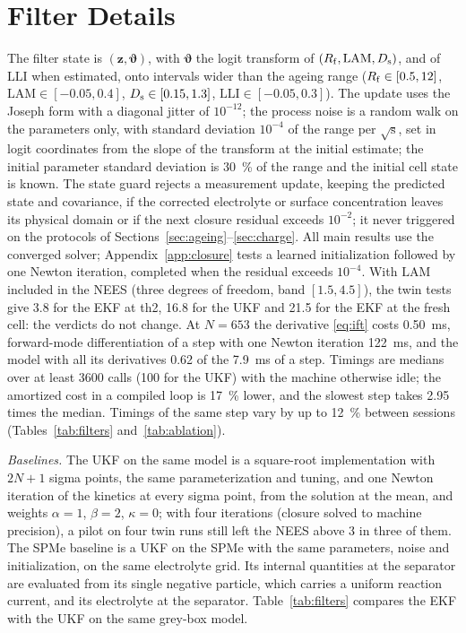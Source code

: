 \documentclass[journal]{IEEEtran}
\newcommand{\vz}{\bm{z}}\newcommand{\vj}{\bm{j}}\newcommand{\vy}{\bm{y}}\newcommand{\vw}{\bm{w}}
\newcommand{\LAM}{\mathrm{LAM}}\newcommand{\LLI}{\mathrm{LLI}}\newcommand{\phipl}{\phi_{\mathrm{pl}}}
\begin{document}
\section{Filter Details}\label{app:filter}
The filter state is $(\vz,\bm\vartheta)$, with $\bm\vartheta$ the logit transform of $(\Rf,\LAM,\Ds)$, and of $\LLI$ when estimated, onto intervals wider than the ageing range ($R_{\mathrm{f}}\in[0.5,12]$, $\LAM\in[-0.05,0.4]$, $D_{\mathrm{s}}\in[0.15,1.3]$, $\LLI\in[-0.05,0.3]$). The update uses the Joseph form with a diagonal jitter of $10^{-12}$; the process noise is a random walk on the parameters only, with standard deviation $10^{-4}$ of the range per $\sqrt{\mathrm{s}}$, set in logit coordinates from the slope of the transform at the initial estimate; the initial parameter standard deviation is \SI{30}{\percent} of the range and the initial cell state is known. The state guard rejects a measurement update, keeping the predicted state and covariance, if the corrected electrolyte or surface concentration leaves its physical domain or if the next closure residual exceeds $10^{-2}$; it never triggered on the protocols of Sections~\ref{sec:ageing}--\ref{sec:charge}. All main results use the converged solver; Appendix~\ref{app:closure} tests a learned initialization followed by one Newton iteration, completed when the residual exceeds $10^{-4}$. With $\LAM$ included in the NEES (three degrees of freedom, band $[1.5,4.5]$), the twin tests give 3.8 for the EKF at th2, 16.8 for the UKF and 21.5 for the EKF at the fresh cell: the verdicts do not change. At $N=653$ the derivative \eqref{eq:ift} costs \SI{0.50}{\milli\second}, forward-mode differentiation of a step with one Newton iteration \SI{122}{\milli\second}, and the model with all its derivatives 0.62 of the \SI{7.9}{\milli\second} of a step. Timings are medians over at least 3600 calls (100 for the UKF) with the machine otherwise idle; the amortized cost in a compiled loop is \SI{17}{\percent} lower, and the slowest step takes 2.95 times the median. Timings of the same step vary by up to \SI{12}{\percent} between sessions (Tables~\ref{tab:filters} and~\ref{tab:ablation}).

\emph{Baselines.} The UKF on the same model is a square-root implementation with $2N+1$ sigma points, the same parameterization and tuning, and one Newton iteration of the kinetics at every sigma point, from the solution at the mean, and weights $\alpha=1$, $\beta=2$, $\kappa=0$; with four iterations (closure solved to machine precision), a pilot on four twin runs still left the NEES above 3 in three of them. The SPMe baseline is a UKF on the SPMe\cite{marquis2019,moura2017} with the same parameters, noise and initialization, on the same electrolyte grid. Its internal quantities at the separator are evaluated from its single negative particle, which carries a uniform reaction current, and its electrolyte at the separator. Table~\ref{tab:filters} compares the EKF with the UKF on the same grey-box model.
\end{document}
